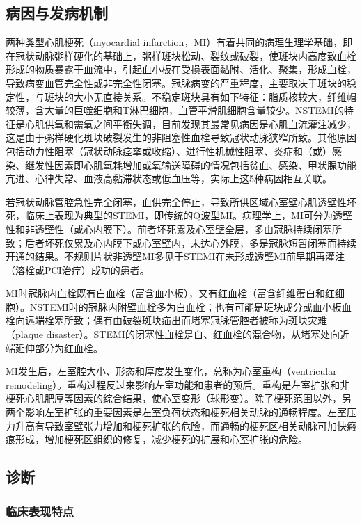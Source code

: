 \subsection{病因与发病机制}

两种类型心肌梗死（myocardial
infarction，MI）有着共同的病理生理学基础，即在冠状动脉粥样硬化的基础上，粥样斑块松动、裂纹或破裂，使斑块内高度致血栓形成的物质暴露于血流中，引起血小板在受损表面黏附、活化、聚集，形成血栓，导致病变血管完全性或非完全性闭塞。冠脉病变的严重程度，主要取决于斑块的稳定性，与斑块的大小无直接关系。不稳定斑块具有如下特征：脂质核较大，纤维帽较薄，含大量的巨噬细胞和T淋巴细胞，血管平滑肌细胞含量较少。NSTEMI的特征是心肌供氧和需氧之间平衡失调，目前发现其最常见病因是心肌血流灌注减少，这是由于粥样硬化斑块破裂发生的非阻塞性血栓导致冠状动脉狭窄所致。其他原因包括动力性阻塞（冠状动脉痉挛或收缩）、进行性机械性阻塞、炎症和（或）感染、继发性因素即心肌氧耗增加或氧输送障碍的情况包括贫血、感染、甲状腺功能亢进、心律失常、血液高黏滞状态或低血压等，实际上这5种病因相互关联。

若冠状动脉管腔急性完全闭塞，血供完全停止，导致所供区域心室壁心肌透壁性坏死，临床上表现为典型的STEMI，即传统的Q波型MI。病理学上，MI可分为透壁性和非透壁性（或心内膜下）。前者坏死累及心室壁全层，多由冠脉持续闭塞所致；后者坏死仅累及心内膜下或心室壁内，未达心外膜，多是冠脉短暂闭塞而持续开通的结果。不规则片状非透壁MI多见于STEMI在未形成透壁MI前早期再灌注（溶栓或PCI治疗）成功的患者。

MI时冠脉内血栓既有白血栓（富含血小板），又有红血栓（富含纤维蛋白和红细胞）。NSTEMI时的冠脉内附壁血栓多为白血栓；也有可能是斑块成分或血小板血栓向远端栓塞所致；偶有由破裂斑块疝出而堵塞冠脉管腔者被称为斑块灾难（plaque
disaster）。STEMI的闭塞性血栓是白、红血栓的混合物，从堵塞处向近端延伸部分为红血栓。

MI发生后，左室腔大小、形态和厚度发生变化，总称为心室重构（ventricular
remodeling）。重构过程反过来影响左室功能和患者的预后。重构是左室扩张和非梗死心肌肥厚等因素的综合结果，使心室变形（球形变）。除了梗死范围以外，另两个影响左室扩张的重要因素是左室负荷状态和梗死相关动脉的通畅程度。左室压力升高有导致室壁张力增加和梗死扩张的危险，而通畅的梗死区相关动脉可加快瘢痕形成，增加梗死区组织的修复，减少梗死的扩展和心室扩张的危险。

\subsection{诊断}

\subsubsection{临床表现特点}

